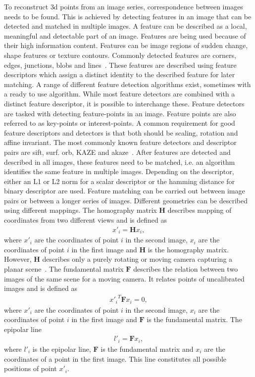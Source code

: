 To reconstruct \gls{3d} points from an image series, correspondence between images needs to be found. This is achieved by detecting features in an image that can be detected and matched in multiple images. A feature can be described as a local, meaningful and detectable part of an image. Features are being used because of their high information content. Features can be image regions of sudden change, shape features or texture contours. Commonly detected features are corners, edges, junctions, blobs and lines~\cite{Tareen2018ABRISK}. These features are described using feature descriptors which assign a distinct identity to the described feature for later matching. A range of different feature detection algorithms  exist, sometimes with a ready to use algorithm. While most feature detectors are combined with a distinct feature descriptor, it is possible to interchange these. Feature detectors are tasked with detecting feature-points in an image. Feature points are also referred to as key-points or interest-points. A common requirement for good feature descriptors and detectors is that both should be scaling, rotation and affine invariant. The most commonly known feature detectors and descriptor pairs are \gls{sift}, \gls{surf}. \gls{orb}, KAZE and \gls{akaze}~\cite{Tareen2018ABRISK}.
After features are detected and described in all images, these features need to be matched, i.e. an algorithm identifies the same feature in multiple images. Depending on the descriptor, either an L1 or L2 norm for a scalar descriptor or the hamming distance for binary descriptor are used. Feature matching can be carried out between image pairs or between a longer series of images. Different geometries can be described using different mappings. The homography matrix $\textbf{H}$ describes mapping of coordinates from two different views and is defined as
\begin{align}
    x'_i = \textbf{H}x_i, \label{eq:homography_m}
\end{align}
where $x'_i$ are the coordinates of point $i$ in the second image, $x_i$ are the coordinates of point $i$ in the first image and $\textbf{H}$ is the homography matrix. However, $\textbf{H}$ describes only a purely rotating or moving camera capturing a planar scene~\cite{schonberger2016structure}.
The fundamental matrix $\textbf{F}$ describes the relation between two images of the same scene for a moving camera. It relates points of uncalibrated images and is defined as
\begin{align}
    {x'_i}^{T}\textbf{F}x_i = 0, \label{eq:fundamental_m}
\end{align}
where $x'_i$ are the coordinates of point $i$ in the second image, $x_i$ are the coordinates of point $i$ in the first image and $\textbf{F}$ is the fundamental matrix. The epipolar line
\begin{align}
    l'_i = \textbf{F}x_i, \label{eq:epipolar_l}
\end{align}
where $l'_i$ is the epipolar line, $\textbf{F}$ is the fundamental matrix and $x_i$ are the coordinates of a point in the first image. This line constitutes all possible positions of point $x'_i$.


